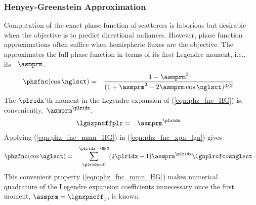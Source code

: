 \documentclass[12pt]{article}
\begin{document}
\subsubsection[Henyey-Greenstein Approximation]{Henyey-Greenstein Approximation}
Computation of the exact phase function of scatterers is laborious but 
desirable when the objective is to predict directional radiances.
However, phase function approximations often suffice when hemispheric
fluxes are the objective.
The  approximates the full
phase function in terms of its first Legendre moment, i.e., its
~$\asmprm$.
\begin{eqnarray}
\label{eqn:phz_fnc_HG}
\phzfnc(\cos\nglsct) 
& = & 
\frac{1-\asmprm^{2}}{(1+\asmprm^{2}-2\asmprm\cos\nglsct)^{3/2}}
\end{eqnarray}
The $\plridx$'th moment in the Legendre expansion of
(\ref{eqn:phz_fnc_HG}) is, conveniently,~$\asmprm^{\plridx}$.
\begin{eqnarray}
\lgnxpncffplr & = & \asmprm^{\plridx}
\label{eqn:phz_fnc_mmn_HG}
\end{eqnarray}
Applying (\ref{eqn:phz_fnc_mmn_HG}) in (\ref{eqn:phz_fnc_xpn_lgn}) gives
\begin{eqnarray}
\label{eqn:phz_fnc_xpn_lgn}
\phzfnc(\cos\nglsct) & = & \sum_{\plridx=0}^{\plridx=\NNN}
(2\plridx+1) \asmprm^{\plridx} \lgnplrofcosnglsct 
\end{eqnarray}
This convenient property (\ref{eqn:phz_fnc_mmn_HG}) makes numerical
quadrature of the Legendre expansion coefficients unnecessary once the
first moment, $\asmprm = \lgnxpncff_{1}$, is known.
\end{document}
